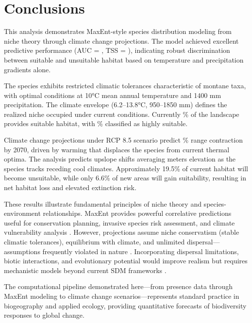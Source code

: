 \documentclass[11pt,a4paper]{article}
\begin{document}
\section{Conclusions}

This analysis demonstrates MaxEnt-style species distribution modeling from niche theory through climate change projections. The model achieved excellent predictive performance (AUC = , TSS = ), indicating robust discrimination between suitable and unsuitable habitat based on temperature and precipitation gradients alone.

The species exhibits restricted climatic tolerances characteristic of montane taxa, with optimal conditions at 10°C mean annual temperature and 1400 mm precipitation. The climate envelope (6.2--13.8°C, 950--1850 mm) defines the realized niche occupied under current conditions. Currently \% of the landscape provides suitable habitat, with \% classified as highly suitable.

Climate change projections under RCP 8.5 scenario predict \% range contraction by 2070, driven by warming that displaces the species from current thermal optima. The analysis predicts upslope shifts averaging  meters elevation as the species tracks receding cool climates. Approximately 19.5\% of current habitat will become unsuitable, while only 6.6\% of new areas will gain suitability, resulting in net habitat loss and elevated extinction risk.

These results illustrate fundamental principles of niche theory and species-environment relationships. MaxEnt provides powerful correlative predictions useful for conservation planning, invasive species risk assessment, and climate vulnerability analysis \cite{elith2009species}. However, projections assume niche conservatism (stable climatic tolerances), equilibrium with climate, and unlimited dispersal—assumptions frequently violated in nature \cite{araujo2005validation}. Incorporating dispersal limitations, biotic interactions, and evolutionary potential would improve realism but requires mechanistic models beyond current SDM frameworks \cite{kearney2009mechanistic}.

The computational pipeline demonstrated here—from presence data through MaxEnt modeling to climate change scenarios—represents standard practice in biogeography and applied ecology, providing quantitative forecasts of biodiversity responses to global change.
\end{document}
